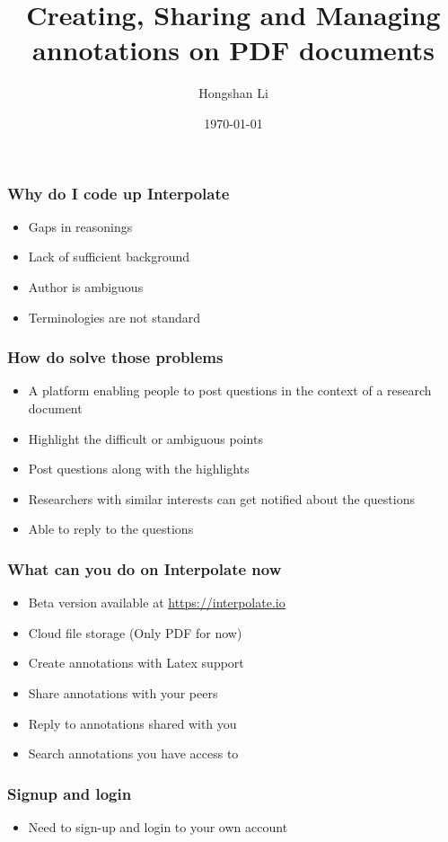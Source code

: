 \documentclass{beamer}
\title[Interpolate Platform Demo]{Creating, Sharing and Managing 
annotations on PDF documents}
\author{Hongshan Li}
\institute{
Purdue University\newline
}
\date{\today}
\begin{document}
\begin{frame}
\titlepage
\end{frame}

\begin{frame}
\frametitle{Why do I code up Interpolate}
\begin{itemize}
\item Gaps in reasonings
\item Lack of sufficient background
\item Author is ambiguous 
\item Terminologies are not standard
\end{itemize}
\end{frame}


\begin{frame}
\frametitle{How do solve those problems}
\begin{itemize}
\item A platform enabling people to post questions
in the context of a research document
\item Highlight the difficult or ambiguous points
\item Post questions along with the highlights
\item Researchers with similar interests can 
get notified about the questions
\item Able to reply to the questions
\end{itemize}
\end{frame}



\begin{frame}
\frametitle{What can you do on Interpolate now}
\begin{itemize}
\item Beta version available at 
\href{https://interpolate.io}{
{\color{blue} \underline{https://interpolate.io}}
}

\item Cloud file storage (Only PDF for now)
\item Create annotations with Latex support 
\item Share annotations with your peers
\item Reply to annotations shared with you
\item Search annotations you have access to 
\end{itemize}
\end{frame}

\begin{frame}
\frametitle{Signup and login}
\begin{itemize}
\item Need to sign-up and login to your own account
\end{itemize}

\end{frame}
\end{document}
